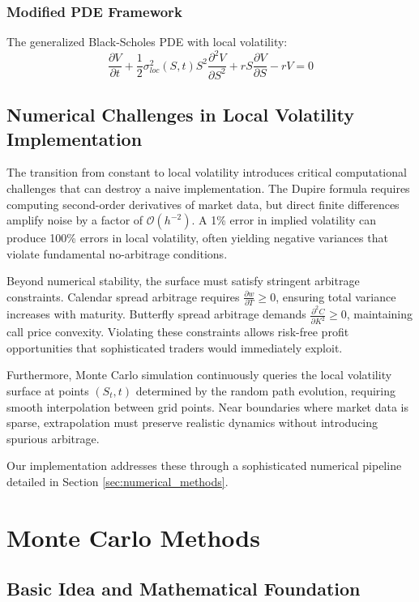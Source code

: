 \documentclass[11pt,a4paper]{article}
\begin{document}
\subsubsection{Modified PDE Framework}
The generalized Black-Scholes PDE with local volatility:
\begin{equation}
\frac{\partial V}{\partial t} + \frac{1}{2}\sigma_{loc}^2(S,t)S^2\frac{\partial^2 V}{\partial S^2} + rS\frac{\partial V}{\partial S} - rV = 0
\end{equation}

\subsection{Numerical Challenges in Local Volatility Implementation}

The transition from constant to local volatility introduces critical computational challenges that can destroy a naive implementation. The Dupire formula requires computing second-order derivatives of market data, but direct finite differences amplify noise by a factor of $\mathcal{O}(h^{-2})$. A 1\% error in implied volatility can produce 100\% errors in local volatility, often yielding negative variances that violate fundamental no-arbitrage conditions.

Beyond numerical stability, the surface must satisfy stringent arbitrage constraints. Calendar spread arbitrage requires $\frac{\partial w}{\partial T} \geq 0$, ensuring total variance increases with maturity. Butterfly spread arbitrage demands $\frac{\partial^2 C}{\partial K^2} \geq 0$, maintaining call price convexity. Violating these constraints allows risk-free profit opportunities that sophisticated traders would immediately exploit.

Furthermore, Monte Carlo simulation continuously queries the local volatility surface at points $(S_t, t)$ determined by the random path evolution, requiring smooth interpolation between grid points. Near boundaries where market data is sparse, extrapolation must preserve realistic dynamics without introducing spurious arbitrage.

Our implementation addresses these through a sophisticated numerical pipeline detailed in Section \ref{sec:numerical_methods}.

\section{Monte Carlo Methods}

\subsection{Basic Idea and Mathematical Foundation}
\end{document}
